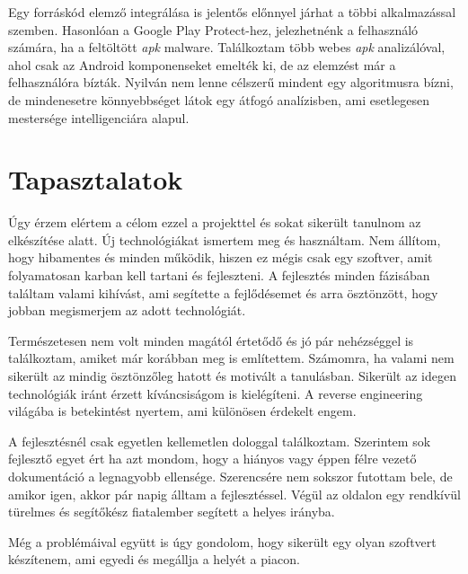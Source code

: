 \documentclass{thesis-ekf}
\theoremstyle{definition}
\theoremstyle{remark}
\begin{document}
Egy forráskód elemző integrálása is jelentős előnnyel járhat a többi alkalmazással szemben. Hasonlóan a Google Play Protect-hez, jelezhetnénk a felhasználó számára, ha a feltöltött \emph{apk} malware.
Találkoztam több webes \emph{apk} analizálóval, ahol csak az Android komponenseket emelték ki, de az elemzést már a felhasználóra bízták.
Nyilván nem lenne célszerű mindent egy algoritmusra bízni, de mindenesetre könnyebbséget látok egy átfogó analízisben, ami esetlegesen mestersége intelligenciára alapul.

\chapter{Tapasztalatok}\label{tapasztalatok}

Úgy érzem elértem a célom ezzel a projekttel és sokat sikerült tanulnom az elkészítése alatt.
Új technológiákat ismertem meg és használtam. Nem állítom, hogy hibamentes és minden működik, hiszen ez mégis csak egy szoftver, amit folyamatosan karban kell tartani és fejleszteni.
A fejlesztés minden fázisában találtam valami kihívást, ami segítette a fejlődésemet és arra ösztönzött, hogy jobban megismerjem az adott technológiát.

Természetesen nem volt minden magától értetődő és jó pár nehézséggel is találkoztam, amiket már korábban meg is említettem.
Számomra, ha valami nem sikerült az mindig ösztönzőleg hatott és motivált a tanulásban. Sikerült az idegen technológiák iránt érzett kíváncsiságom is kielégíteni.
A reverse engineering világába is betekintést nyertem, ami különösen érdekelt engem. 

A fejlesztésnél csak egyetlen kellemetlen dologgal találkoztam. Szerintem sok fejlesztő egyet ért ha azt mondom, hogy a hiányos vagy éppen félre vezető dokumentáció a legnagyobb ellensége.
Szerencsére nem sokszor futottam bele, de amikor igen, akkor pár napig álltam a fejlesztéssel. Végül az oldalon egy rendkívül türelmes és segítőkész fiatalember segített a helyes irányba. 

Még a problémáival együtt is úgy gondolom, hogy sikerült egy olyan szoftvert készítenem, ami egyedi és megállja a helyét a piacon. 
\end{document}
